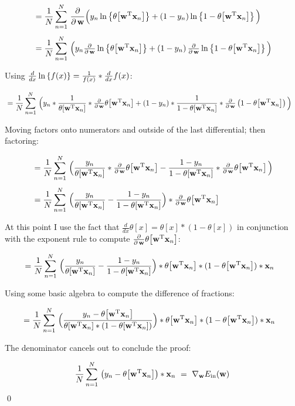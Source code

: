 \begin{align*}
  &= \meanN\ddw \Big(y_n \lnb{\mysig} + (1 - y_n)\lnb{1 - \mysig}\Big)\\[4pt]
  &= \meanN \Big(y_n \tddw \lnb{\mysig} + (1 - y_n) \, \tddw \lnb{1 - \mysig}\Big)
\end{align*}

\noindent Using $\tfrac{d}{dx} \lnb{f(x)} = \tfrac{1}{f(x)} * \tfrac{d}{dx} f(x)$:

\begin{align*}
  &= \meanN \Big(
  y_n * \frac{1}{\mysig} * \tddw \mysig + (1 - y_n) * \frac{1}{1 - \mysig} * \tddw
  \left(1 - \mysig\right)
  \Big)
\end{align*}

Moving factors onto numerators and outside of the last differential; then
factoring:

\begin{align*}
  &= \meanN \Big(
  \frac{y_n}{\mysig} * \tddw \mysig - \frac{1 - y_n}{1 - \mysig} * \tddw
  \mysig
  \Big)\\[4pt]
  &= \meanN \Big(
  \frac{y_n}{\mysig} - \frac{1 - y_n}{1 - \mysig}
  \Big) * \tddw \mysig
\end{align*}

At this point I use the fact that $\tfrac{d}{dx}\theta\!\left[x\right] =
\theta\!\left[x\right] * (1 - \theta\!\left[x\right])$ in conjunction with the
exponent rule to compute $\tddw \mysig$:

\begin{align*}
  &= \meanN \Big(
  \frac{y_n}{\mysig} - \frac{1 - y_n}{1 - \mysig}
  \Big) * \mysig * (1 - \mysig) * \mbf x_n
\end{align*}

\noindent Using some basic algebra to compute the difference of fractions:

\begin{align*}
  &= \meanN \Big(
  \frac{y_n - \mysig}{\mysig * (1 - \mysig)}
  \Big) * \mysig * (1 - \mysig) * \mbf x_n
\end{align*}

\noindent The denominator cancels out to conclude the proof:

\begin{align*}
  \meanN \left(
  y_n - \mysig
  \right) * \mbf x_n\ = \ \nabla_{\mbf w} E_\text{in}(\mbf w)
\end{align*}
\qed


\newcommand{\wz}{\mbf w_0}
\newcommand{\wo}{\mbf w_1}
\newcommand{\wzt}{\mbf w_0^{\text{T}}}
\newcommand{\wot}{\mbf w_1^{\text{T}}}
\newcommand{\wztx}{\mbf w_0^{\text{T}} \mbf x_n}
\newcommand{\wotx}{\mbf w_1^{\text{T}} \mbf x_n}
\newcommand{\norm}[1]{\left\lVert#1\right\rVert}
\newcommand{\abs}[1]{\left|#1\right|}


